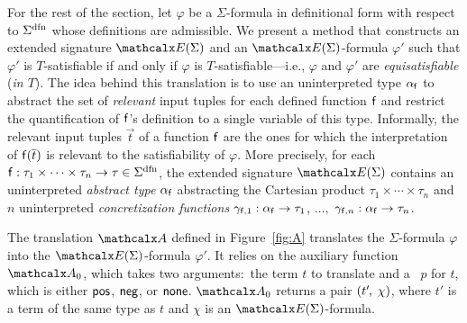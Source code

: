 For the rest of the section, let $\varphi$ be a $\Sigma$-formula
in definitional form with respect to $\sfundefs{\Sigma}$
whose definitions are admissible.
We present a method that constructs an extended signature
$\extendsig{ \Sigma }$ and an $\extendsig{ \Sigma }$-formula $\varphi'$ such that
$\varphi'$ is $T$-satisfiable if and only if $\varphi$ is $T$-satisfiable---i.e.,
$\varphi$ and $\varphi'$ are \emph{equisatisfiable} (\emph{in $T$}).
The idea behind this translation is to use an uninterpreted type $\alpha_{\mathsf{f}}$
to abstract the set of
\emph{relevant} input tuples for each defined function $\mathsf{f}$ and restrict the
quantification of $\mathsf{f}$'s definition to a single variable of this type.
Informally, the relevant input tuples $\vec t$ of a function $\mathsf{f}$ are the
ones for which the interpretation of $\mathsf{f}( \overline{t} )$ is relevant to the
satisfiability of $\varphi$.
More precisely,
for each $\con{f} : \tau_1 \times \cdots \times \tau_n \rightarrow \tau \in \sfundefs{\Sigma}$,
the extended signature $\extendsig{\Sigma}$ contains
an uninterpreted \emph{abstract type} $\alpha_{\mathsf{f}}$ 
abstracting the Cartesian product $\tau_1 \times \cdots \times \tau_n$
and
$n$ uninterpreted \emph{concretization functions} $\gamma_{\mathsf{f},1} : \alpha_{\mathsf{f}} \rightarrow \tau_1$, $\dotsc,$ $\gamma_{\mathsf{f},n} : \alpha_{\mathsf{f}} \rightarrow \tau_n$.

The translation $\conv$ defined in Figure~\ref{fig:A} translates the $\Sigma$-formula
$\varphi$ into the $\extendsig{\Sigma}$-formula $\varphi'$. It relies
on the auxiliary function $\conv_0$, which takes two arguments:\ the term $t$
to translate and a ~$p$ for $t$, which is either $\mathsf{pos}$, $\mathsf{neg}$, or
$\mathsf{none}$.
\vthinspace$\conv_0$ returns a pair $( t'\negvthinspace,\, \chi )$, where $t'$ is a term of
the same type as $t$ and $\chi$ is an $\extendsig{\Sigma}$-formula.


